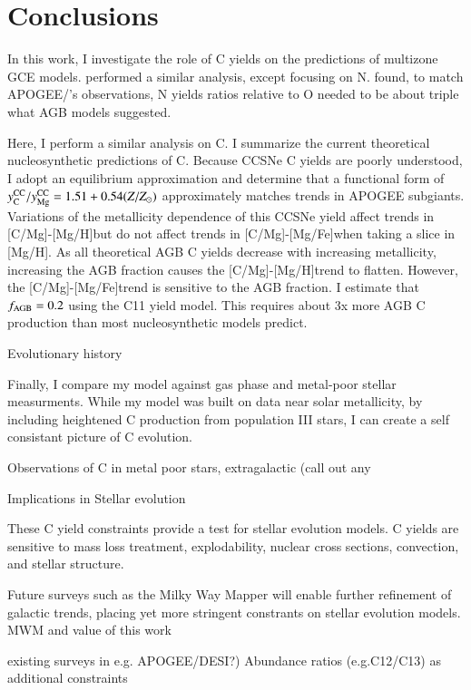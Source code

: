 \documentclass[12pt,oneside]{report}
\newcommand{\caah}{[C/Mg]-[Mg/H]}
\newcommand{\caafe}{[C/Mg]-[Mg/Fe]}
\newcommand{\Ycc}{\ensuremath{y_{\rm C}^{\rm CC}}}
\newcommand{\Yoc}{\ensuremath{y_{\rm Mg}^{\rm CC}}}
\begin{document}
\chapter{Conclusions}

In this work, I investigate the role of C yields on the predictions of multizone GCE models. \citet{james+22} performed a similar analysis, except focusing on N. \citet{james+22} found, to match APOGEE/\citet{fiorenzo+21}'s observations, N yields ratios relative to O needed to be about triple what AGB models suggested.

Here, I perform a similar analysis on C. I summarize the current theoretical nucleosynthetic predictions of C. Because CCSNe C yields are poorly understood, I adopt an equilibrium approximation and determine that a functional form of $\Ycc/\Yoc=1.51 + 0.54 (Z/Z_\odot)$ approximately matches trends in APOGEE subgiants. Variations of the metallicity dependence of this CCSNe yield affect trends in \caah but do not affect trends in \caafe when taking a slice in [Mg/H]. As all theoretical AGB C yields decrease with increasing metallicity, increasing the AGB fraction causes the \caah trend to flatten. However, the \caafe trend is sensitive to the AGB fraction. 
I estimate that $f_{\rm AGB} = 0.2$ using the C11 yield model. This requires about 3x more AGB C production than most nucleosynthetic models predict.

Evolutionary history

Finally, I compare my model against gas phase and metal-poor stellar measurments. While my model was built on data near solar metallicity, by including heightened C production from population III stars, I can create a self consistant picture of C evolution.

Observations of C in metal poor stars, extragalactic (call out any

Implications in Stellar evolution

These C yield constraints provide a test for stellar evolution models. C yields are sensitive to mass loss treatment, explodability, nuclear cross sections, convection, and stellar structure. 

Future surveys such as the Milky Way Mapper will enable further refinement of galactic trends, placing yet more stringent constrants on stellar evolution models.
MWM and value of this work

existing surveys in e.g. APOGEE/DESI?)
Abundance ratios (e.g.C12/C13) as additional constraints
\end{document}
